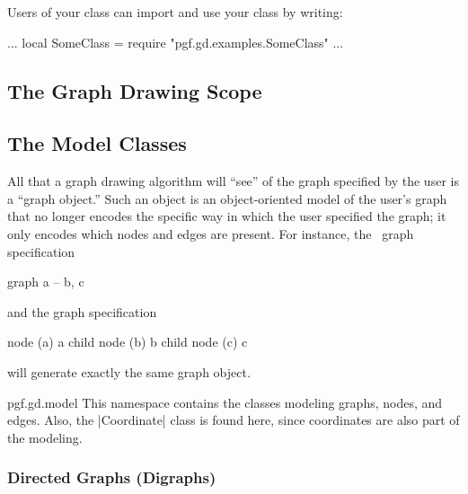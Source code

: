 Users of your class can import and use your class by writing:
\begin{codeexample}
...
local SomeClass = require "pgf.gd.examples.SomeClass"
...  
\end{codeexample}




\subsection{The Graph Drawing Scope}

\label{section-gd-gd-scope}




\subsection{The Model Classes}

\label{section-gd-models}

All that a graph drawing algorithm will ``see'' of the graph specified
by the user is a ``graph object.'' Such an object is an
object-oriented model of the user's graph that no longer encodes the
specific way in which the user specified the graph; it only encodes
which nodes and edges are present. For instance, the \tikzname\ graph
specification 
\begin{codeexample}
graph { a -- {b, c} }
\end{codeexample}
\noindent and the graph specification
\begin{codeexample}
node (a) { a }
child { node (b) {b} }
child { node (c) {c} }
\end{codeexample}
will generate exactly the same graph object.

\begin{luanamespace}{pgf.gd.}{model}
  This namespace contains the classes modeling graphs,
  nodes, and edges. Also, the |Coordinate| class is found here, since
  coordinates are also part of the modeling.  
\end{luanamespace}


\subsubsection{Directed Graphs (Digraphs)}

